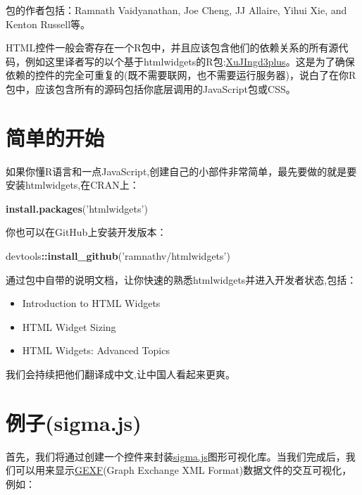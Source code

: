 \documentclass[]{book}
\newenvironment{Shaded}{\begin{snugshade}}{\end{snugshade}}
\newcommand{\KeywordTok}[1]{\textcolor[rgb]{0.13,0.29,0.53}{\textbf{#1}}}
\newcommand{\StringTok}[1]{\textcolor[rgb]{0.31,0.60,0.02}{#1}}
\newcommand{\OperatorTok}[1]{\textcolor[rgb]{0.81,0.36,0.00}{\textbf{#1}}}
\newcommand{\NormalTok}[1]{#1}
\theoremstyle{definition}
\theoremstyle{definition}
\theoremstyle{definition}
\theoremstyle{remark}
\begin{document}
包的作者包括：Ramnath Vaidyanathan, Joe Cheng, JJ Allaire, Yihui Xie,
and Kenton Russell等。

HTML控件一般会寄存在一个R包中，并且应该包含他们的依赖关系的所有源代码，例如这里译者写的以个基于htmlwidgets的R包:\href{https://github.com/DataXujing/XuJIngd3plus}{XuJIngd3plus}。这是为了确保依赖的控件的完全可重复的(既不需要联网，也不需要运行服务器)，说白了在你R包中，应该包含所有的源码包括你底层调用的JavaScript包或CSS。

\section{简单的开始}

如果你懂R语言和一点JavaScript,创建自己的小部件非常简单，最先要做的就是要安装htmlwidgets,在CRAN上：

\begin{Shaded}
\begin{Highlighting}[]
\KeywordTok{install.packages}\NormalTok{(}\StringTok{'htmlwidgets'}\NormalTok{)}
\end{Highlighting}
\end{Shaded}

你也可以在GitHub上安装开发版本：

\begin{Shaded}
\begin{Highlighting}[]
\NormalTok{devtools}\OperatorTok{::}\KeywordTok{install_github}\NormalTok{(}\StringTok{'ramnathv/htmlwidgets'}\NormalTok{)}
\end{Highlighting}
\end{Shaded}

通过包中自带的说明文档，让你快速的熟悉htmlwidgets并进入开发者状态,包括：

\begin{itemize}
\item
  Introduction to HTML Widgets
\item
  HTML Widget Sizing
\item
  HTML Widgets: Advanced Topics
\end{itemize}

我们会持续把他们翻译成中文,让中国人看起来更爽。

\section{例子(sigma.js)}\label{sigma.js}

首先，我们将通过创建一个控件来封装\href{http://sigmajs.org/}{sigma.js}图形可视化库。当我们完成后，我们可以用来显示\href{https://gephi.org/gexf/format/}{GEXF}(Graph
Exchange XML Format)数据文件的交互可视化，例如：
\end{document}
